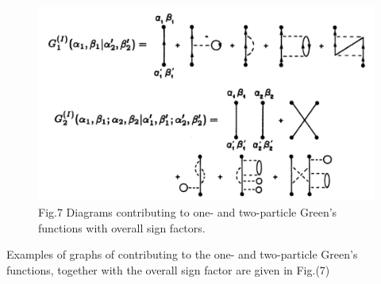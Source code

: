 \documentclass[12pt]{article}
\begin{document}
\begin{figure}[H]
    \centering
    \includegraphics[width=12cm]{p16.png}
    \caption*{Fig.7 Diagrams contributing to one- and two-particle Green's 
    functions with overall sign factors.}
    \label{}
\end{figure}
Examples of graphs of contributing to the one- and two-particle Green's 
functions, together with the overall sign factor are given in Fig.(7)
\end{document}
